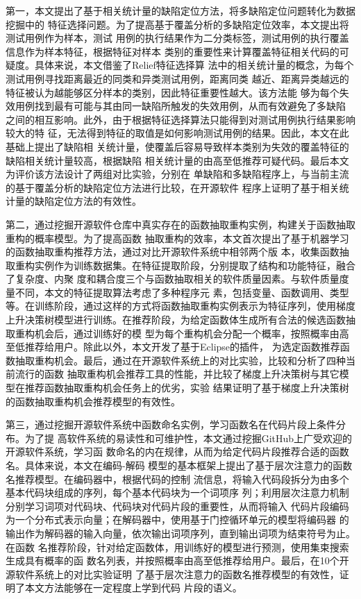 第一，本文提出了基于相关统计量的缺陷定位方法，将多缺陷定位问题转化为数据挖掘中的
特征选择问题。为了提高基于覆盖分析的多缺陷定位效率，本文提出将测试用例作为样本，测试
用例的执行结果作为二分类标签，测试用例的执行覆盖信息作为样本特征，根据特征对样本
类别的重要性来计算覆盖特征相关代码的可疑度。具体来说，本文借鉴了Relief特征选择算
法中的相关统计量的概念，为每个测试用例寻找距离最近的同类和异类测试用例，距离同类
越近、距离异类越远的特征被认为越能够区分样本的类别，因此特征重要性越大。该方法能
够为每个失效用例找到最有可能与其由同一缺陷所触发的失效用例，从而有效避免了多缺陷
之间的相互影响。此外，由于根据特征选择算法只能得到对测试用例执行结果影响较大的特
征，无法得到特征的取值是如何影响测试用例的结果。因此，本文在此基础上提出了缺陷相
关统计量，使覆盖后容易导致样本类别为失效的覆盖特征的缺陷相关统计量较高，根据缺陷
相关统计量的由高至低推荐可疑代码。最后本文为评价该方法设计了两组对比实验，分别在
单缺陷和多缺陷程序上，与当前主流的基于覆盖分析的缺陷定位方法进行比较，在开源软件
程序上证明了基于相关统计量的缺陷定位方法的有效性。

第二，通过挖掘开源软件仓库中真实存在的函数抽取重构实例，构建关于函数抽取重构的概率模型。为了提高函数
抽取重构的效率，本文首次提出了基于机器学习的函数抽取重构推荐方法，通过对比开源软件系统中相邻两个版
本，收集函数抽取重构实例作为训练数据集。在特征提取阶段，分别提取了结构和功能特征，融合了复杂度、内聚
度和耦合度三个与函数抽取相关的软件质量因素。与软件质量度量不同，本文的特征提取算法考虑了多种程序元
素，包括变量、函数调用、类型等。在训练阶段，通过这样的方式将函数抽取重构实例表示为特征序列，使用梯度
上升决策树模型进行训练。在推荐阶段，为给定函数体生成所有合法的候选函数抽取重构机会后，通过训练好的模
型为每个重构机会分配一个概率，按照概率由高至低推荐给用户。除此以外，本文开发了基于Eclipse的插件，
为选定函数推荐函数抽取重构机会。最后，通过在开源软件系统上的对比实验，比较和分析了四种当前流行的函数
抽取重构机会推荐工具的性能，并比较了梯度上升决策树与其它模型在推荐函数抽取重构机会任务上的优劣，实验
结果证明了基于梯度上升决策树的函数抽取重构机会推荐模型的有效性。

第三，通过挖掘开源软件系统中函数命名实例，学习函数名在代码片段上条件分布。为了提
高软件系统的易读性和可维护性，本文通过挖掘GitHub上广受欢迎的开源软件系统，学习函
数命名的内在规律，从而为给定代码片段推荐合适的函数名。具体来说，本文在编码-解码
模型的基本框架上提出了基于层次注意力的函数名推荐模型。在编码器中，根据代码的控制
流信息，将输入代码段拆分为由多个基本代码块组成的序列，每个基本代码块为一个词项序
列；利用层次注意力机制分别学习词项对代码块、代码块对代码片段的重要性，从而将输入
代码片段编码为一个分布式表示向量；在解码器中，使用基于门控循环单元的模型将编码器
的输出作为解码器的输入向量，依次输出词项序列，直到输出词项为结束符号为止。在函数
名推荐阶段，针对给定函数体，用训练好的模型进行预测，使用集束搜索生成具有概率的函
数名列表，并按照概率由高至低推荐给用户。最后，在10个开源软件系统上的对比实验证明
了基于层次注意力的函数名推荐模型的有效性，证明了本文方法能够在一定程度上学到代码
片段的语义。

